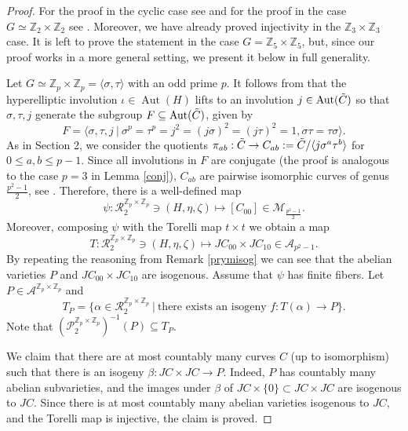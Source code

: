 \documentclass{amsart}
\theoremstyle{remark}
\numberwithin{equation}{section}
\newcommand{\ZZ}{\mathbb Z}
\newcommand{\tC}{\Tilde{C}}
\DeclareMathOperator{\Aut}{Aut}
\begin{document}
\begin{proof}

    For the proof in the cyclic case see \cite{Ago} and for the proof in the case \(G \simeq \mathbb{Z}_2 \times \mathbb{Z}_2\) see \cite{BO19}. Moreover, we have already proved injectivity in the $\ZZ_3\times\ZZ_3$ case. It is left to prove the statement in the case $G = \ZZ_5 \times \ZZ_5$, but, since our proof works in a more general setting, we present it below in full generality.

    Let $G \simeq \mathbb{Z}_p \times \mathbb{Z}_p = \langle \sigma, \tau \rangle$ with an odd prime $p$.     
    It follows from \cite{ries} that the hyperelliptic involution $\iota \in \Aut(H)$ lifts to an involution $j \in \Aut(\Tilde{C})$ so that $\sigma, \tau, j$ generate the subgroup $F \subseteq \Aut(\Tilde{C})$,  given by $$F = \langle \sigma, \tau, j \: | \: \sigma^p = \tau^p = j^2 = (j\sigma)^2 = (j\tau)^2 = 1, \sigma\tau = \tau\sigma \rangle.$$ As in Section 2, we consider the quotients $\pi_{ab}: \tC \to C_{ab} := \tC/\langle j\sigma^a \tau^b\rangle$ for $0 \leq a,b \leq p-1$.
    Since all involutions in $F$ are conjugate (the proof is analogous to the case $p=3$ in Lemma \ref{conj}), $C_{ab}$ are pairwise isomorphic curves of genus $\frac{p^2-1}{2}$, see \cite{ortega}. Therefore, there is a well-defined map $$\psi: \mathcal{R}_{2}^{\mathbb{Z}_p \times \mathbb{Z}_p} \ni (H, \eta, \zeta) \mapsto [C_{00}] \in \mathcal{M}_{\frac{p^2-1}{2}}.$$ 
    Moreover, composing $\psi$ with the Torelli map $t \times t$ we obtain a map $$T: \mathcal{R}_2^{\mathbb{Z}_p \times \mathbb{Z}_p} \ni (H, \eta, \zeta) \mapsto JC_{00} \times JC_{10} \in \mathcal{A}_{p^2-1}.$$ By repeating the reasoning from Remark \ref{prymisog} we can see that the abelian varieties $P$ and $JC_{00} \times JC_{10}$ are isogenous. Assume that $\psi$ has finite fibers. 
    Let $P \in \mathcal{A}^{\mathbb{Z}_p \times \mathbb{Z}_p}$ and $$T_P = \{\alpha \in \mathcal{R}_2^{\mathbb{Z}_p \times \mathbb{Z}_p} \: | \: \text{there exists an isogeny } f:T(\alpha) \to P\}.$$ Note that $(\mathcal{P}_2^{\mathbb{Z}_p \times \mathbb{Z}_p})^{-1}(P) \subseteq T_P$.

    We claim that there are at most countably many curves $C$ (up to isomorphism) such that there is an isogeny $\beta: JC \times JC \to P$. Indeed, $P$ has countably many abelian subvarieties, and the images under $\beta$ of $JC \times \{0\} \subset JC \times JC$ are isogenous to $JC$. Since there is at most countably many abelian varieties isogenous to $JC$, and the Torelli map is injective, the claim is proved.  


\end{proof}
\end{document}

